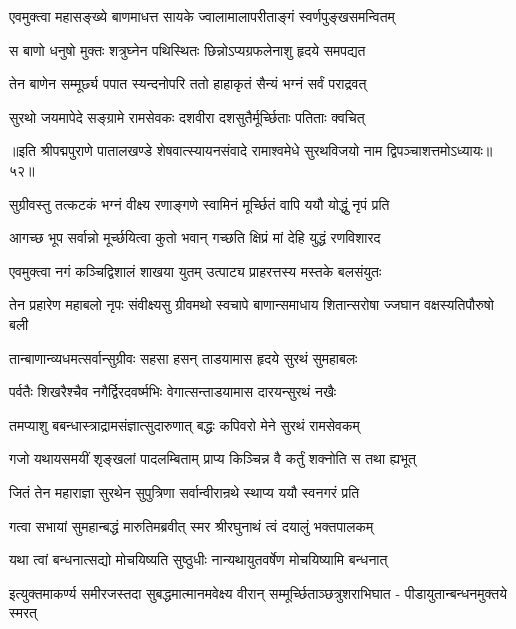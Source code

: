 \twolineshloka
{एवमुक्त्वा महासङ्ख्ये बाणमाधत्त सायके}
{ज्वालामालापरीताङ्गं स्वर्णपुङ्खसमन्वितम्}%

\twolineshloka
{स बाणो धनुषो मुक्तः शत्रुघ्नेन पथिस्थितः}
{छिन्नोऽप्यग्रफलेनाशु हृदये समपद्यत}%

\twolineshloka
{तेन बाणेन सम्मूर्छ्य पपात स्यन्दनोपरि}
{ततो हाहाकृतं सैन्यं भग्नं सर्वं पराद्रवत्}%

\twolineshloka
{सुरथो जयमापेदे सङ्ग्रामे रामसेवकः}
{दशवीरा दशसुतैर्मूर्च्छिताः पतिताः क्वचित्}%

॥इति श्रीपद्मपुराणे पातालखण्डे शेषवात्स्यायनसंवादे रामाश्वमेधे सुरथविजयो नाम द्विपञ्चाशत्तमोऽध्यायः॥५२॥



\twolineshloka
{सुग्रीवस्तु तत्कटकं भग्नं वीक्ष्य रणाङ्गणे}
{स्वामिनं मूर्च्छितं वापि ययौ योद्धुं नृपं प्रति}%

\twolineshloka
{आगच्छ भूप सर्वान्नो मूर्च्छयित्वा कुतो भवान्}
{गच्छति क्षिप्रं मां देहि युद्धं रणविशारद}%

\twolineshloka
{एवमुक्त्वा नगं कञ्चिद्विशालं शाखया युतम्}
{उत्पाट्य प्राहरत्तस्य मस्तके बलसंयुतः}%

\fourlineindentedshloka
{तेन प्रहारेण महाबलो नृपः}
{संवीक्ष्यसु ग्रीवमथो स्वचापे}
{बाणान्समाधाय शितान्सरोषा}
{ज्जघान वक्षस्यतिपौरुषो बली}%

\twolineshloka
{तान्बाणान्व्यधमत्सर्वान्सुग्रीवः सहसा हसन्}
{ताडयामास हृदये सुरथं सुमहाबलः}%

\twolineshloka
{पर्वतैः शिखरैश्चैव नगैर्द्विरदवर्ष्मभिः}
{वेगात्सन्ताडयामास दारयन्सुरथं नखैः}%

\twolineshloka
{तमप्याशु बबन्धास्त्राद्रामसंज्ञात्सुदारुणात्}
{बद्धः कपिवरो मेने सुरथं रामसेवकम्}%

\twolineshloka
{गजो यथायसमयीं शृङ्खलां पादलम्बिताम्}
{प्राप्य किञ्चिन्न वै कर्तुं शक्नोति स तथा ह्यभूत्}%

\twolineshloka
{जितं तेन महाराज्ञा सुरथेन सुपुत्रिणा}
{सर्वान्वीरान्रथे स्थाप्य ययौ स्वनगरं प्रति}%

\twolineshloka
{गत्वा सभायां सुमहान्बद्धं मारुतिमब्रवीत्}
{स्मर श्रीरघुनाथं त्वं दयालुं भक्तपालकम्}%

\twolineshloka
{यथा त्वां बन्धनात्सद्यो मोचयिष्यति सुष्ठुधीः}
{नान्यथायुतवर्षेण मोचयिष्यामि बन्धनात्}%

\fourlineindentedshloka
{इत्युक्तमाकर्ण्य समीरजस्तदा}
{सुबद्धमात्मानमवेक्ष्य वीरान्}
{सम्मूर्च्छिताञ्छत्रुशराभिघात -}
{पीडायुतान्बन्धनमुक्तये स्मरत्}%

